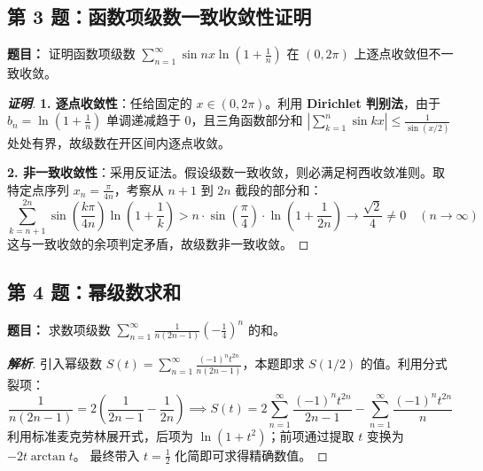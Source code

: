 \documentclass[11pt,a4paper]{article}
\begin{document}
	\begin{tcolorbox}[examstyle]
		\subsection*{第 3 题：函数项级数一致收敛性证明}
		\textbf{题目：} 证明函数项级数 $\sum_{n=1}^\infty \sin nx \ln\left(1 + \frac{1}{n}\right)$ 在 $(0,2\pi)$ 上逐点收敛但不一致收敛。
		
		\begin{proof}[\textbf{证明}]
			\item \textbf{1. 逐点收敛性}：任给固定的 $x \in (0, 2\pi)$。利用 \textbf{Dirichlet 判别法}，由于 $b_n = \ln(1+\frac{1}{n})$ 单调递减趋于 $0$，且三角函数部分和 $\left| \sum_{k=1}^n \sin kx \right| \le \frac{1}{\sin(x/2)}$ 处处有界，故级数在开区间内逐点收敛。
			
			\item \textbf{2. 非一致收敛性}：采用反证法。假设级数一致收敛，则必满足柯西收敛准则。取特定点序列 $x_n = \frac{\pi}{4n}$，考察从 $n+1$ 到 $2n$ 截段的部分和：
			$$ \sum_{k=n+1}^{2n} \sin\left(\frac{k\pi}{4n}\right) \ln\left(1+\frac{1}{k}\right) > n \cdot \sin\left(\frac{\pi}{4}\right) \cdot \ln\left(1+\frac{1}{2n}\right) \to \frac{\sqrt{2}}{4} \neq 0 \quad (n \to \infty) $$
			这与一致收敛的余项判定矛盾，故级数非一致收敛。
		\end{proof}
	\end{tcolorbox}
	
	\begin{tcolorbox}[examstyle]
		\subsection*{第 4 题：幂级数求和}
		\textbf{题目：} 求数项级数 $\sum_{n=1}^\infty \frac{1}{n(2n-1)} \left(-\frac{1}{4}\right)^n$ 的和。
		
		\begin{proof}[\textbf{解析}]
			引入幂级数 $S(t) = \sum_{n=1}^\infty \frac{(-1)^n t^{2n}}{n(2n-1)}$，本题即求 $S(1/2)$ 的值。利用分式裂项：
			$$ \frac{1}{n(2n-1)} = 2 \left( \frac{1}{2n-1} - \frac{1}{2n} \right) \implies S(t) = 2 \sum_{n=1}^\infty \frac{(-1)^n t^{2n}}{2n-1} - \sum_{n=1}^\infty \frac{(-1)^n t^{2n}}{n} $$
			利用标准麦克劳林展开式，后项为 $\ln(1+t^2)$；前项通过提取 $t$ 变换为 $-2t\arctan t$。
			最终带入 $t = \frac{1}{2}$ 化简即可求得精确数值。
		\end{proof}
	\end{tcolorbox}
	
\end{document}
